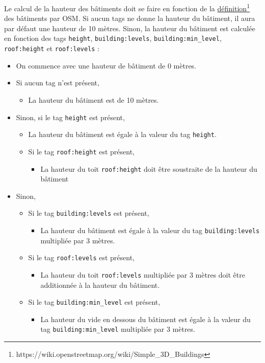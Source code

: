 Le calcul de la hauteur des bâtiments doit se faire en fonction de la \href{https://wiki.openstreetmap.org/wiki/Simple_3D_Buildings}{définition}\footnote{https://wiki.openstreetmap.org/wiki/Simple\_3D\_Buildings} des bâtiments par OSM. Si aucun tags ne donne la hauteur du bâtiment, il aura par défaut une hauteur de 10 mètres. Sinon, la hauteur du bâtiment est calculée en fonction des tags \texttt{height}, \texttt{building:levels}, \texttt{building:min\_level}, \texttt{roof:height} et \texttt{roof:levels} :

\begin{itemize}
    \item On commence avec une hauteur de bâtiment de 0 mètres.
    \item Si aucun tag n'est présent,
          \begin{itemize}
              \item La hauteur du bâtiment est de 10 mètres.
          \end{itemize}
    \item Sinon, si le tag \texttt{height} est présent,
          \begin{itemize}
              \item La hauteur du bâtiment est égale à la valeur du tag \texttt{height}.
              \item Si le tag \texttt{roof:height} est présent,
                    \begin{itemize}
                        \item La hauteur du toit \texttt{roof:height} doit être soustraite de la hauteur du bâtiment
                    \end{itemize}
          \end{itemize}
    \item Sinon,
          \begin{itemize}
              \item Si le tag \texttt{building:levels} est présent,
                    \begin{itemize}
                        \item La hauteur du bâtiment est égale à la valeur du tag \texttt{building:levels} multipliée par 3 mètres.
                    \end{itemize}
              \item Si le tag \texttt{roof:levels} est présent,
                    \begin{itemize}
                        \item La hauteur du toit \texttt{roof:levels} multipliée par 3 mètres doit être additionnée à la hauteur du bâtiment.
                    \end{itemize}
              \item Si le tag \texttt{building:min\_level} est présent,
                    \begin{itemize}
                        \item La hauteur du vide en dessous du bâtiment est égale à la valeur du tag \texttt{building:min\_level} multipliée par 3 mètres.
                    \end{itemize}
          \end{itemize}
\end{itemize}

